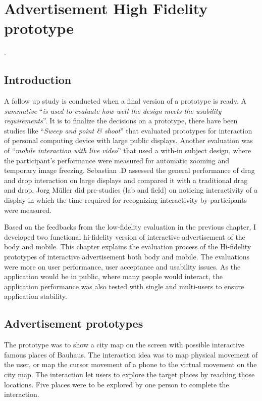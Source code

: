 \chapter{Advertisement High Fidelity prototype} %

\label{Chapter6} %

\newpage
.
\newpage

\section{Introduction}
A follow up study is conducted when a final version of a prototype is ready. A \emph{summative} ``\emph{is used to evaluate how well the design meets the usability requirements}''\cite{summative}. It is to finalize the decisions on a prototype, there have been studies like ``\emph{Sweep and point \& shoot}'' \cite{SweepPointShoot} that evaluated prototypes for interaction of personal computing device with large public displays. Another evaluation was of ``\emph{mobile interaction with live video}'' \cite{TouchProjector} that used a with-in subject design, where the participant’s performance were measured for automatic zooming and temporary image freezing. Sebastian .D \cite{WalldragandDrop} assessed the general performance of drag and drop interaction on large displays and compared it with a traditional drag and drop. Jorg Müller \cite{LookingGlass} did pre-studies (lab and field) on noticing interactivity of a display in which the time required for recognizing interactivity by participants were measured.

Based on the feedbacks from the low-fidelity evaluation in the previous chapter, I developed two functional hi-fidelity version of interactive advertisement of the body and mobile. This chapter explains the evaluation process of the Hi-fidelity prototypes of interactive advertisement both body and mobile. The evaluations were more on user performance, user acceptance and usability issues. As the application would be in public, where many people would interact, the application performance was also tested with single and multi-users to ensure application stability.


\section{Advertisement prototypes}
The prototype was to show a city map on the screen with possible interactive famous places of Bauhaus. The interaction idea was to map physical movement of the user, or map the cursor movement of a phone to the virtual movement on the city map. The interaction let users to explore the target places by reaching those locations. Five places were to be explored by one person to complete the interaction.


